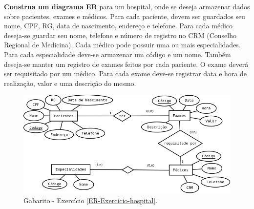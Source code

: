 \documentclass[12pt]{exam}
\begin{document}
\begin{questions}
\newpage

\question \textbf{Construa um diagrama ER} para um hospital, onde se deseja armazenar dados sobre pacientes, exames e médicos. Para cada paciente, devem ser guardados seu nome, CPF, RG, data de nascimento, endereço e telefone. Para cada médico deseja-se guardar seu nome, telefone e número de registro no CRM (Conselho Regional de Medicina). Cada médico pode possuir uma ou mais especialidades. Para cada especialidade deve-se armazenar um código e um nome. Também deseja-se manter um registro de exames feitos por cada paciente. O exame deverá ser requisitado por um médico. Para cada exame deve-se registrar data e hora de realização, valor e uma descrição do mesmo.  \label{ER-Exercicio-hospital}

\begin{figure}[!htp]
\centering
\includegraphics[width=1\linewidth]{figuras/ER-Exercicio-hospital.png}
\caption{Gabarito - Exercício \ref{ER-Exercicio-hospital}.}
\end{figure}

\end{questions}
\end{document}
